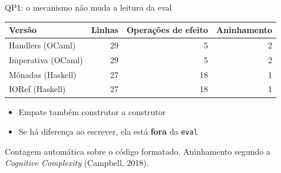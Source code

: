 \documentclass[aspectratio=169,10pt]{beamer}
\newcommand{\oc}[1]{\textcolor{ocamlc}{#1}}
\newcommand{\hs}[1]{\textcolor{haskellc}{#1}}
\begin{document}
\begin{frame}{QP1: o mecanismo não muda a leitura da eval}
  \vspace{4pt}
  \begin{center}
  \begin{tabular}{lrrr}
    \toprule
    \textbf{Versão} & \textbf{Linhas} & \textbf{Operações de efeito} & \textbf{Aninhamento} \\
    \midrule
    \oc{Handlers (OCaml)} & 29 & 5 & 2 \\
    Imperativa (OCaml) & 29 & 5 & 2 \\
    \midrule
    \hs{Mônadas (Haskell)} & 27 & 18 & 1 \\
    IORef (Haskell) & 27 & 18 & 1 \\
    \bottomrule
  \end{tabular}
  \end{center}
  \vspace{6pt}
  \begin{itemize}
    \item Empate também construtor a construtor
    \item Se há diferença ao escrever, ela está \textbf{fora} da \texttt{eval}
  \end{itemize}
  \vfill
  {\small\color{neutral} Contagem automática sobre o código formatado. Aninhamento segundo a \emph{Cognitive Complexity} (Campbell, 2018).}
\end{frame}
\end{document}
